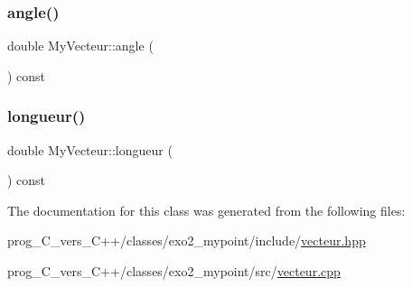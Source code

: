 \mbox{\label{classMyVecteur_a20233c42b105ad8f1fd4a62d2d005568}} 
\subsubsection{\texorpdfstring{angle()}{angle()}}
{\footnotesize\ttfamily double My\+Vecteur\+::angle (\begin{DoxyParamCaption}{ }\end{DoxyParamCaption}) const}

\mbox{\label{classMyVecteur_a11c7da61089ff7495cc81b78cfcfdd7a}} 
\subsubsection{\texorpdfstring{longueur()}{longueur()}}
{\footnotesize\ttfamily double My\+Vecteur\+::longueur (\begin{DoxyParamCaption}{ }\end{DoxyParamCaption}) const}



The documentation for this class was generated from the following files\+:\begin{DoxyCompactItemize}
\item 
prog\+\_\+\+C\+\_\+vers\+\_\+\+C++/classes/exo2\+\_\+mypoint/include/\hyperlink{vecteur_8hpp}{vecteur.\+hpp}\item 
prog\+\_\+\+C\+\_\+vers\+\_\+\+C++/classes/exo2\+\_\+mypoint/src/\hyperlink{vecteur_8cpp}{vecteur.\+cpp}\end{DoxyCompactItemize}

